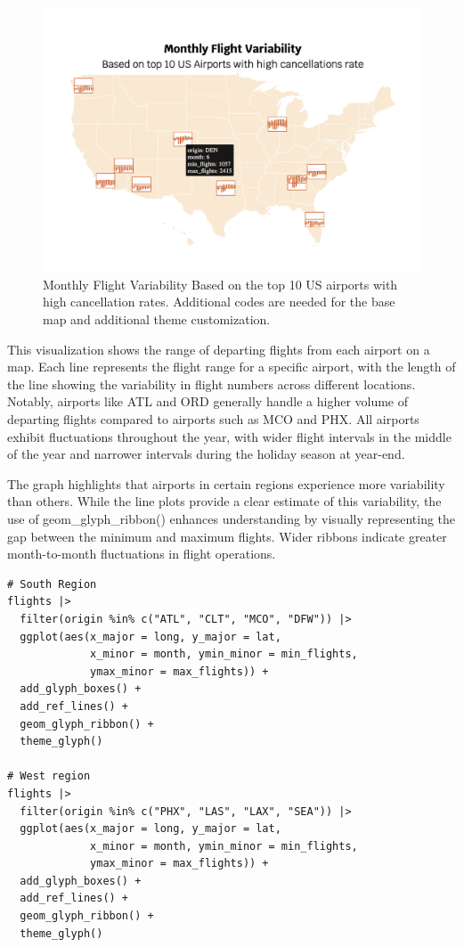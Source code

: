 \begin{figure}
\includegraphics[width=15.14in]{figures/monthly-flight-variability} \caption{Monthly Flight Variability Based on the top 10 US airports with high cancellation rates. Additional codes are needed for the base map and additional theme customization.}\label{fig:unnamed-chunk-19}
\end{figure}

This visualization shows the range of departing flights from each airport on a map. Each line represents the flight range for a specific airport, with the length of the line showing the variability in flight numbers across different locations. Notably, airports like ATL and ORD generally handle a higher volume of departing flights compared to airports such as MCO and PHX. All airports exhibit fluctuations throughout the year, with wider flight intervals in the middle of the year and narrower intervals during the holiday season at year-end.

The graph highlights that airports in certain regions experience more variability than others. While the line plots provide a clear estimate of this variability, the use of geom\_glyph\_ribbon() enhances understanding by visually representing the gap between the minimum and maximum flights. Wider ribbons indicate greater month-to-month fluctuations in flight operations.

\begin{verbatim}
# South Region
flights |> 
  filter(origin %in% c("ATL", "CLT", "MCO", "DFW")) |>
  ggplot(aes(x_major = long, y_major = lat,
             x_minor = month, ymin_minor = min_flights,
             ymax_minor = max_flights)) + 
  add_glyph_boxes() +
  add_ref_lines() +
  geom_glyph_ribbon() +
  theme_glyph()

# West region
flights |> 
  filter(origin %in% c("PHX", "LAS", "LAX", "SEA")) |>
  ggplot(aes(x_major = long, y_major = lat,
             x_minor = month, ymin_minor = min_flights,
             ymax_minor = max_flights)) + 
  add_glyph_boxes() +
  add_ref_lines() +
  geom_glyph_ribbon() +
  theme_glyph()
\end{verbatim}

